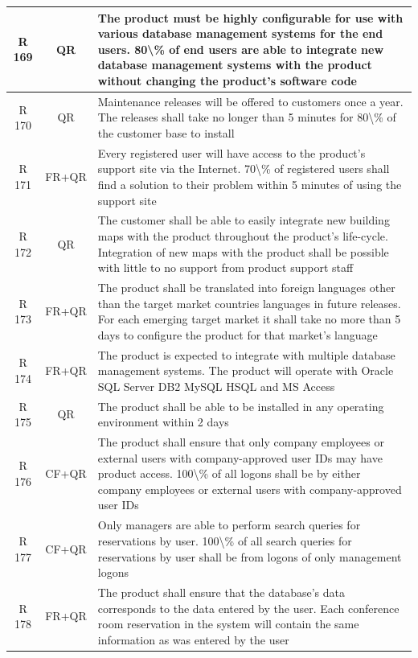 \documentclass[dissertation,final]{softeng}
\begin{document}
\begin{appendices}
\begin{center}
\begin{longtable}{c c m{}}
    R 169   & QR & The product must be highly configurable for use with various database management systems for the end users. 80\textbackslash{}\% of end users are able to integrate new database management systems with the product without changing the product's software code \\    \midrule
    R 170   & QR & Maintenance releases will be offered to customers once a year. The releases shall take no longer than 5 minutes for 80\textbackslash{}\% of the customer base to install \\    \midrule
    R 171   & FR+QR & Every registered user will have access to the product's support site via the Internet. 70\textbackslash{}\% of registered users shall find a solution to their problem within 5 minutes of using the support site \\    \midrule
    R 172   & QR & The customer shall be able to easily integrate new building maps with the product throughout the product's life-cycle. Integration of new maps with the product shall be possible with little to no support from product support staff \\    \midrule
    R 173   & FR+QR & The product shall be translated into foreign languages other than the target market countries languages in future releases. For each emerging target market it shall take no more than 5 days to configure the product for that market's language \\    \midrule
    R 174   & FR+QR & The product is expected to integrate with multiple database management systems. The product will operate with Oracle SQL Server DB2 MySQL HSQL and MS Access \\    \midrule
    R 175   & QR & The product shall be able to be installed in any operating environment within 2 days \\    \midrule
    R 176   & CF+QR & The product shall ensure that only company employees or external users with company-approved user IDs may have product access. 100\textbackslash{}\% of all logons shall be by either company employees or external users with company-approved user IDs \\    \midrule
    R 177   & CF+QR & Only managers are able to perform search queries for reservations by user. 100\textbackslash{}\% of all search queries for reservations by user shall be from logons of only management logons \\    \midrule
    R 178   & FR+QR & The product shall ensure that the database's data corresponds to the data entered by the user. Each conference room reservation in the system will contain the same information as was entered by the user \\*    \midrule

\end{longtable}
\end{center}
\end{appendices}
\end{document}
